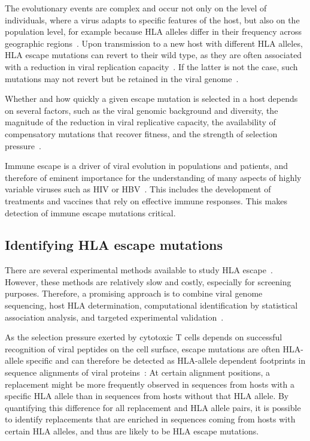 \documentclass[fleqn,11pt]{SelfArx} %
\begin{document}
The evolutionary events are complex and occur not only on the level of individuals, where a virus adapts to specific features of the host, but also on the population level, for example because HLA alleles differ in their frequency across geographic regions~\cite{Kawashima2009}. Upon transmission to a new host with different HLA alleles, HLA escape mutations can revert to their wild type, as they are often associated with a reduction in viral replication capacity~\cite{Matthews2008}. If the latter is not the case, such mutations may not revert but be retained in the viral genome~\cite{Kawashima2009}.

Whether and how quickly a given escape mutation is selected in a host depends on several factors, such as the viral genomic background and diversity, the magnitude of the reduction in viral replicative capacity, the availability of compensatory mutations that recover fitness, and the strength of selection pressure~\cite{Kloverpris2016}.

Immune escape is a driver of viral evolution in populations and patients, and therefore of eminent importance for the understanding of many aspects of highly variable viruses such as HIV or HBV~\cite{Alizon2011}\cite{Allen2005}\cite{Rousseau2008}\cite{Lumley2018}. This includes the development of treatments and vaccines that rely on effective immune responses. This makes detection of immune escape mutations critical.

\subsection{Identifying HLA escape mutations}

There are several experimental methods available to study HLA escape~\cite{Timm2004}. However, these methods are relatively slow and costly, especially for screening purposes. Therefore, a promising approach is to combine viral genome sequencing, host HLA determination, computational identification by statistical association analysis, and targeted experimental validation~\cite{Carlson2012}.

As the selection pressure exerted by cytotoxic T cells depends on successful recognition of viral peptides on the cell surface, escape mutations are often HLA-allele specific and can therefore be detected as HLA-allele dependent footprints in sequence alignments of viral proteins~\cite{Moore2002}: At certain alignment positions, a replacement might be more frequently observed in sequences from hosts with a specific HLA allele than in  sequences from hosts without that HLA allele. By quantifying this difference for all replacement and HLA allele pairs, it is possible to identify replacements that are enriched in sequences coming from hosts with certain HLA alleles, and thus are likely to be HLA escape mutations.
\end{document}
